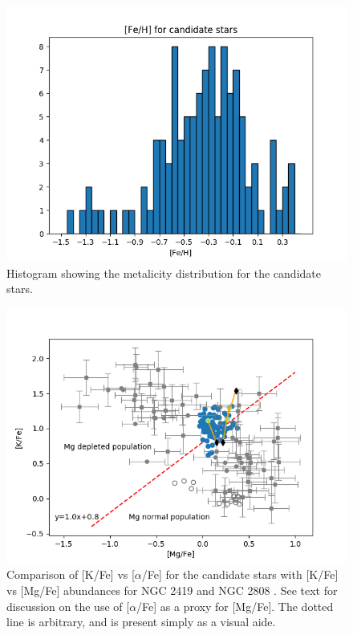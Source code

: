 \documentclass[a4paper,fleqn,usenatbib]{mnras}
\begin{document}
\begin{figure}
	\includegraphics[width=\columnwidth]{histof113.png}
    \caption{Histogram showing the metalicity distribution for the candidate stars.}
    \label{mhist}
\end{figure}

\begin{figure}
	\includegraphics[width=\columnwidth]{Kvsmgmod.png}
    \caption{Comparison of [K/Fe] vs [$\alpha$/Fe] for the candidate stars with [K/Fe] vs [Mg/Fe] abundances for NGC 2419 and NGC 2808 \citep{cohenkirby2012, mucciarelli2012, mucciarelli2015}. See text for discussion on the use of [$\alpha$/Fe] as a proxy for [Mg/Fe]. The dotted line is arbitrary, and is present simply as a visual aide.}
    \label{KvsMg}
\end{figure}
\end{document}
